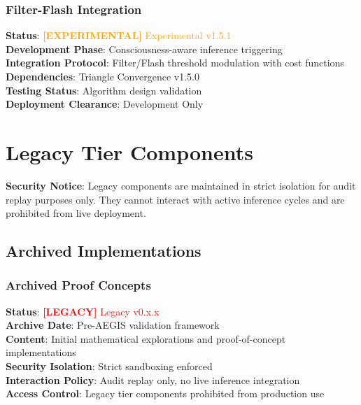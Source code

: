 \documentclass[11pt,letterpaper]{article}
\newcommand{\experimentalcomponent}[1]{\textcolor{orange}{\textbf{[EXPERIMENTAL]} #1}}
\newcommand{\legacycomponent}[1]{\textcolor{red}{\textbf{[LEGACY]} #1}}
\begin{document}
\subsubsection{Filter-Flash Integration}
\textbf{Status}: \experimentalcomponent{Experimental v1.5.1} \\
\textbf{Development Phase}: Consciousness-aware inference triggering \\
\textbf{Integration Protocol}: Filter/Flash threshold modulation with cost functions \\
\textbf{Dependencies}: Triangle Convergence v1.5.0 \\
\textbf{Testing Status}: Algorithm design validation \\
\textbf{Deployment Clearance}: Development Only

\section{Legacy Tier Components}
\label{sec:legacy}

\textbf{Security Notice}: Legacy components are maintained in strict isolation for audit replay purposes only. They cannot interact with active inference cycles and are prohibited from live deployment.

\subsection{Archived Implementations}

% 
% 

\subsubsection{Archived Proof Concepts}
\textbf{Status}: \legacycomponent{Legacy v0.x.x} \\
\textbf{Archive Date}: Pre-AEGIS validation framework \\
\textbf{Content}: Initial mathematical explorations and proof-of-concept implementations \\
\textbf{Security Isolation}: Strict sandboxing enforced \\
\textbf{Interaction Policy}: Audit replay only, no live inference integration \\
\textbf{Access Control}: Legacy tier components prohibited from production use
\end{document}
